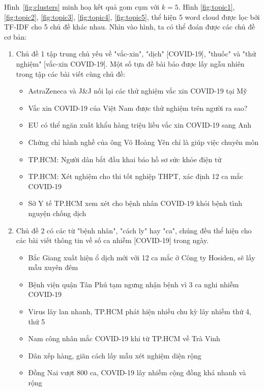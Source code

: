 Hình~\ref{fig:clusters} minh hoạ kết quả gom cụm với $k=5$. Hình
\ref{fig:topic1}, \ref{fig:topic2}, \ref{fig:topic3}, \ref{fig:topic4},
\ref{fig:topic5}, thể hiện 5 word cloud được lọc bởi TF-IDF cho 5 chủ đề khác
nhau. Nhìn vào hình, ta có thể đoán được các chủ đề cơ bản:
\begin{enumerate}
    \item Chủ đề 1 tập trung chủ yếu về "vắc-xin", "dịch" [COVID-19], "thuốc"
        và "thử nghiệm" [vắc-xin COVID-19]. Một số tựa đề bài báo được lấy ngẫu
        nhiên trong tập các bài viết cùng chủ đề:
        \begin{itemize}
            \item AstraZeneca và J\&J nối lại các thử nghiệm vắc xin COVID-19 tại Mỹ
            \item Vắc xin COVID-19 của Việt Nam được thử nghiệm trên người ra sao?
            \item EU có thể ngăn xuất khẩu hàng triệu liều vắc xin COVID-19 sang Anh
            \item Chứng chỉ hành nghề của ông Võ Hoàng Yên chỉ là giúp việc chuyên môn
            \item TP.HCM: Người dân bắt đầu khai báo hồ sơ sức khỏe điện tử
            \item TP.HCM: Xét nghiệm cho thi tốt nghiệp THPT, xác định 12 ca mắc COVID-19
            \item Sở Y tế TP.HCM xem xét cho bệnh nhân COVID-19 khỏi bệnh tình nguyện chống dịch
        \end{itemize}
    \item Chủ đề 2 có các từ "bệnh nhân", "cách ly" hay "ca", chúng đều thể
        hiện cho các bài viết thông tin về số ca nhiễm [COVID-19] trong ngày.
        \begin{itemize}
            \item Bắc Giang xuất hiện ổ dịch mới với 12 ca mắc ở Công ty Hosiden, sẽ lấy mẫu xuyên đêm
            \item Bệnh viện quận Tân Phú tạm ngưng nhận bệnh vì 3 ca nghi nhiễm COVID-19
            \item Virus lây lan nhanh, TP.HCM phát hiện nhiều chu kỳ lây nhiễm thứ 4, thứ 5
            \item Nam công nhân mắc COVID-19 khi từ TP.HCM về Trà Vinh
            \item Dân xếp hàng, giãn cách lấy mẫu xét nghiệm diện rộng
            \item Đồng Nai vượt 800 ca, COVID-19 lây nhiễm cộng đồng khá nhanh và rộng

\end{itemize}
\end{enumerate}
